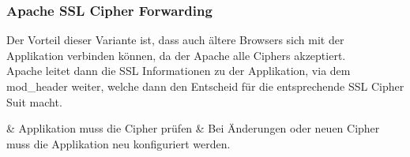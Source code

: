 \subsubsection{Apache SSL Cipher Forwarding}
Der Vorteil dieser Variante ist, dass auch ältere Browsers sich mit der Applikation verbinden können, da der Apache alle Ciphers akzeptiert.\\

Apache leitet dann die SSL Informationen zu der Applikation,  via dem mod\_header weiter, welche dann den Entscheid für die entsprechende SSL Cipher Suit macht.
\begin{easylist}
	& Applikation muss die Cipher prüfen
	& Bei Änderungen oder neuen Cipher muss die Applikation neu konfiguriert werden.
\end{easylist}	
